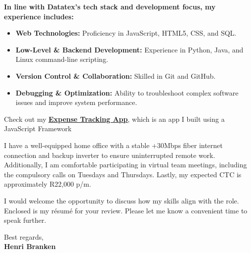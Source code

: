 \documentclass[a4paper,10pt]{article}
\begin{document}
	\textbf{In line with Datatex's tech stack and development focus, my experience includes:}
	\begin{itemize}
		\item \textbf{Web Technologies:} Proficiency in JavaScript, HTML5, CSS, and SQL.
		\item \textbf{Low-Level \& Backend Development:} Experience in Python, Java, and Linux command-line scripting.
		\item \textbf{Version Control \& Collaboration:} Skilled in Git and GitHub.
		\item \textbf{Debugging \& Optimization:} Ability to troubleshoot complex software issues and improve system performance.
	\end{itemize}
	
	\vspace{0.5cm}
	
	\begin{center}	
		{\fontsize{11}{10}\selectfont\textcolor{burnt}{\faHandPointRight} Check out my \href{https://expense-tracker-five-sepia.vercel.app/}{\textbf{\underline{Expense Tracking App}}}, which is an app I built using a JavaScript Framework \textcolor{burnt}{\faHandPointLeft}}
	\end{center}
	
	\vspace{0.5cm}
	
	I have a well-equipped home office with a stable +30Mbps fiber internet connection and backup inverter to ensure uninterrupted remote work. Additionally, I am comfortable participating in virtual team meetings, including the compulsory calls on Tuesdays and Thursdays. Lastly, my expected CTC is approximately R22,000 p/m.
	
	I would welcome the opportunity to discuss how my skills align with the role. Enclosed is my résumé for your review. Please let me know a convenient time to speak further.
	
	\vspace{0.5cm}
	Best regards,\\
	\textbf{Henri Branken}	
\end{document}
